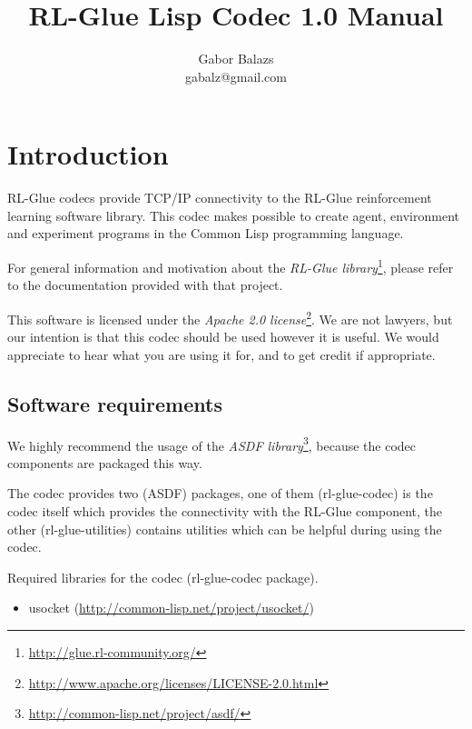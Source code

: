 \documentclass[11pt,a4paper,dvipdfm]{article}
\newcommand{\selfref}[1]{\href{#1}{#1}}
\newcommand{\footref}[2]{\textsl{#1}\footnote{\selfref{#2}}}
\begin{document}
\title{RL-Glue Lisp Codec 1.0 Manual}
\author{Gabor Balazs \\ gabalz@gmail.com}
\date{}

\maketitle
\setcounter{tocdepth}{2}
\tableofcontents
\newpage


\section{Introduction}

RL-Glue codecs provide TCP/IP connectivity to the RL-Glue reinforcement
learning software library. This codec makes possible to create agent,
environment and experiment programs in the Common Lisp programming language.

For general information and motivation about the
\footref{RL-Glue library}{http://glue.rl-community.org/}, please refer to the
documentation provided with that project.

This software is licensed under the
\footref{Apache 2.0 license}{http://www.apache.org/licenses/LICENSE-2.0.html}.
We are not lawyers, but our intention is that this codec should be used however
it is useful. We would appreciate to hear what you are using it for, and to get
credit if appropriate.

\hypertarget{softreqs}{\subsection{Software requirements}}

We highly recommend the usage of the
\footref{ASDF library}{http://common-lisp.net/project/asdf/},
because the codec components are packaged this way.

The codec provides two (ASDF) packages, one of them (rl-glue-codec) is
the codec itself which provides the connectivity with the RL-Glue component,
the other (rl-glue-utilities) contains utilities which can be helpful during
using the codec.

Required libraries for the codec (rl-glue-codec package).
\begin{itemize}
\item[] usocket (\selfref{http://common-lisp.net/project/usocket/})
\end{itemize}
\end{document}
